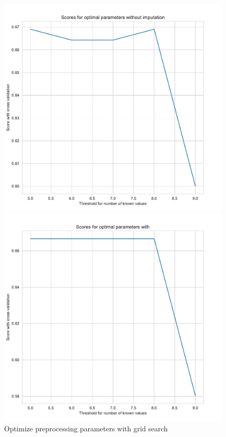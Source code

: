 \documentclass[11pt]{article}
\begin{document}
\begin{figure}[h]
\begin{minipage}[l]{0.5\textwidth}
\includegraphics[width=1\linewidth]{bridges/threshold_grid_ppn0.pdf}
\end{minipage}
\begin{minipage}[l]{0.5\textwidth}
\includegraphics[width=1\linewidth]{bridges/threshold_grid_ppn1.pdf}
\end{minipage}
\caption{Optimize preprocessing parameters with grid search}
\label{Fig:: PPN_treshhol_grid}
\end{figure}
\end{document}
